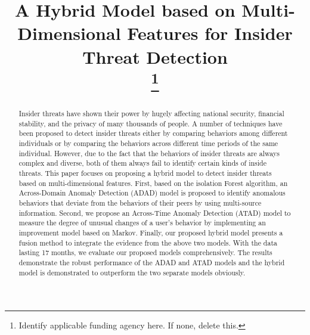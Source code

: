\documentclass[conference]{IEEEtran}
\begin{document}
\title{A Hybrid Model based on Multi-Dimensional Features for Insider Threat Detection\\
\thanks{Identify applicable funding agency here. If none, delete this.}
}

\author{

}

\maketitle

\begin{abstract}
Insider threats have shown their power by hugely affecting national security, financial stability, and the privacy of many thousands of people.
A number of techniques have been proposed to detect insider threats either by comparing behaviors among different individuals or by comparing the behaviors across different time periods of the same individual. However, due to the fact that the behaviors of insider threats are always complex and diverse, both of them always fail to identify certain kinds of inside threats.
This paper focuses on proposing a hybrid model to detect insider threats based on multi-dimensional features.
First, based on the isolation Forest algorithm,  
an Across-Domain Anomaly Detection (ADAD) model is proposed to identify anomalous behaviors that deviate from the behaviors of their peers by using multi-source information. Second, we propose an Across-Time Anomaly Detection (ATAD) model to measure the degree of unusual changes of a user's behavior by implementing an improvement model based on Markov. Finally, our proposed hybrid model presents a fusion
method to integrate the evidence from the above two models. With the data lasting 17 months, we evaluate our proposed models comprehensively. The results demonstrate the robust performance of the ADAD and ATAD models and the hybrid model is demonstrated to outperform the two separate models obviously.


\end{abstract}
\end{document}
